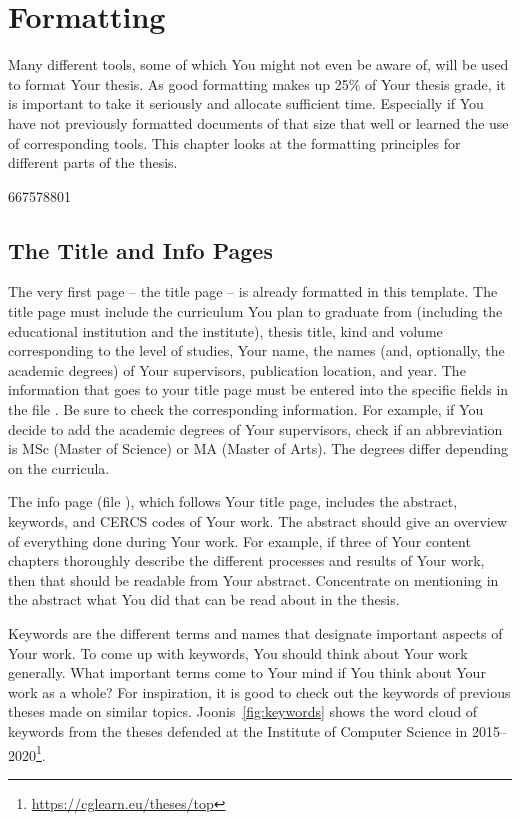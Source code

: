 \section{Formatting}  \label{formatting}
Many different tools, some of which You might not even be aware of, will be used to format Your thesis. As good formatting makes up 25\% of Your thesis grade, it is important to take it seriously and allocate sufficient time. Especially if You have not previously formatted documents of that size that well or learned the use of corresponding tools. This chapter looks at the formatting principles for different parts of the thesis.

667578801\subsection{The Title and Info Pages}
The very first page – the title page – is already formatted in this template. The title page must include the curriculum You plan to graduate from (including the educational institution and the institute), thesis title, kind and volume corresponding to the level of studies, Your name, the names (and, optionally, the academic degrees) of Your supervisors, publication location, and year. The information that goes to your title page must be entered into the specific fields in the file . Be sure to check the corresponding information. For example, if You decide to add the academic degrees of Your supervisors, check if an abbreviation is MSc (Master of Science) or MA (Master of Arts). The degrees differ depending on the curricula.

The info page (file ), which follows Your title page, includes the abstract, keywords, and CERCS codes of Your work. The abstract should give an overview of everything done during Your work. For example, if three of Your content chapters thoroughly describe the different processes and results of Your work, then that should be readable from Your abstract. Concentrate on mentioning in the abstract what You did that can be read about in the thesis.

Keywords are the different terms and names that designate important aspects of Your work. To come up with keywords, You should think about Your work generally. What important terms come to Your mind if You think about Your work as a whole? For inspiration, it is good to check out the keywords of previous theses made on similar topics. Joonis~\ref{fig:keywords} shows the word cloud of keywords from the theses defended at the Institute of Computer Science in 2015–2020\footnote{\url{https://cglearn.eu/theses/top}}.

